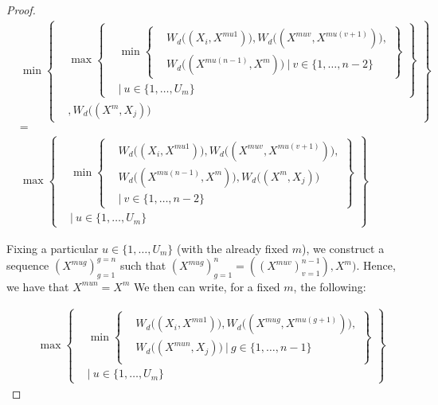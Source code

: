 \documentclass{article} %
\begin{document}
\begin{proof}
\[
\begin{aligned}
&\min
      \left\{
      \begin{aligned}
        &\max
          \left\{
          \begin{aligned}
            &\min\left\{
            \begin{aligned}
            &W_d\big((X_i,X^{mu1})\big), W_d\big((X^{muv},X^{mu(v+1)})\big), \\
            &W_d\big((X^{mu(n-1)},X^m)\big)\ |\ v\in\{1,\ldots,n-2\}
            \end{aligned}
            \right\} \\
            &|\ u\in\{1,\ldots,U_m\}
          \end{aligned}
          \right\} \\
          &, W_d\big((X^m,X_j)\big)
      \end{aligned}
      \right\} \\
      &= \\
&\max
          \left\{
          \begin{aligned}
            &\min\left\{
            \begin{aligned}
            &W_d\big((X_i,X^{mu1})\big), W_d\big((X^{muv},X^{mu(v+1)})\big), \\
            &W_d\big((X^{mu(n-1)},X^m)\big), W_d\big((X^m,X_j)\big)\ \\
            &|\ v\in\{1,\ldots,n-2\}
            \end{aligned}
            \right\} \\
            &|\ u\in\{1,\ldots,U_m\}
          \end{aligned}
          \right\}
\end{aligned}
\]

Fixing a particular $u\in\{1,\ldots,U_m\}$ (with the already fixed $m$), we construct a sequence $(X^{mug})_{g=1}^{g=n}$ such that $(X^{mug})_{g=1}^n=((X^{muv})_{v=1}^{n-1}),X^m)$. Hence, we have that $X^{mun}=X^m$ We then can write, for a fixed $m$, the following:

\[
\begin{aligned}
&\max
          \left\{
          \begin{aligned}
            &\min\left\{
            \begin{aligned}
            &W_d\big((X_i,X^{mu1})\big), W_d\big((X^{mug},X^{mu(g+1)})\big), \\
            &W_d\big((X^{mun},X_j)\big)\ |\ g\in\{1,\ldots,n-1\}\\
            \end{aligned}
            \right\} \\
            &|\ u\in\{1,\ldots,U_m\}
          \end{aligned}
          \right\}
\end{aligned}
\]




\end{proof}
\end{document}
